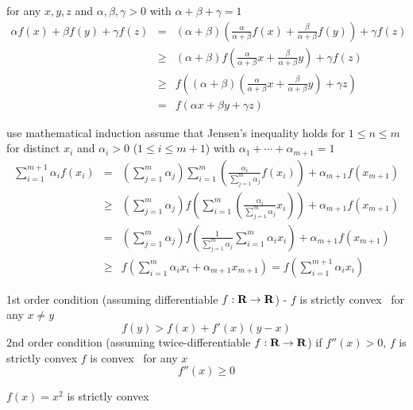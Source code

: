 \documentclass[17pt,landscape]{foils}
\begin{document}
\vfill
{}
\bit
\item for any $x,y,z$ and $\alpha,\beta,\gamma>0$ with $\alpha + \beta + \gamma = 1$
\begin{eqnarray*}
\alpha f(x) + \beta f(y) + \gamma f(z)
&=&
(\alpha+\beta)\left(\frac{\alpha}{\alpha+\beta} f(x) + \frac{\beta}{\alpha + \beta} f(y)\right) + \gamma f(z)
\\
&\geq&
(\alpha+\beta)f\left(\frac{\alpha}{\alpha+\beta} x + \frac{\beta}{\alpha + \beta} y\right) + \gamma f(z)
\\
&\geq&
f\left((\alpha+\beta)\left(\frac{\alpha}{\alpha+\beta} x + \frac{\beta}{\alpha + \beta} y\right) + \gamma z \right)
\\
&=&
f(\alpha x + \beta y + \gamma z )
\end{eqnarray*}
\eit
{}
\bit
\item
use mathematical induction
\bit
\vitem
assume that Jensen's inequality holds for $1\leq n\leq m$
\vitem
for distinct $x_i$ and $\alpha_i>0$ ($1\leq i\leq m+1$) with $\alpha_1 + \cdots + \alpha_{m+1} = 1$
\begin{eqnarray*}
\sum^{m+1}_{i=1} \alpha_i f(x_i)
&=&
\left(\sum^m_{j=1} \alpha_j\right) \sum^m_{i=1} \left(\frac{\alpha_i}{\sum^m_{j=1} \alpha_j} f(x_i)\right) + \alpha_{m+1} f(x_{m+1})
\\
&\geq&
\left(\sum^m_{j=1} \alpha_j\right) f\left(\sum^m_{i=1} \left(\frac{\alpha_i}{\sum^m_{j=1} \alpha_j} x_i\right)\right) + \alpha_{m+1} f(x_{m+1})
\\
&=&
\left(\sum^m_{j=1} \alpha_j\right) f\left(\frac{1}{\sum^m_{j=1} \alpha_j}\sum^m_{i=1} {\alpha_i}{} x_i\right) + \alpha_{m+1} f(x_{m+1})
\\
&\geq&
f\left( \sum^m_{i=1} \alpha_i x_i + \alpha_{m+1} x_{m+1}\right)
=
f\left( \sum^{m+1}_{i=1} \alpha_i x_i \right)
\end{eqnarray*}
\eit
\eit
{}
\bit
\item 1st order condition (assuming differentiable $f:\mbox{\bf R}\to\mbox{\bf R}$)
- $f$ is strictly convex \iaoi\ for any $x\neq y$
\[
f(y) > f(x) + f'(x)(y-x)
\]
\vitem 2nd order condition (assuming twice-differentiable $f:\mbox{\bf R}\to\mbox{\bf R}$)
\bit
\vitem if $f''(x)>0$, $f$ is strictly convex
\vitem $f$ is convex \iaoi\ for any $x$
\[
f''(x) \geq 0
\]
\eit
\eit
\vfill
{}
\bit
\item $f(x)=x^2$ is strictly convex
\end{document}
